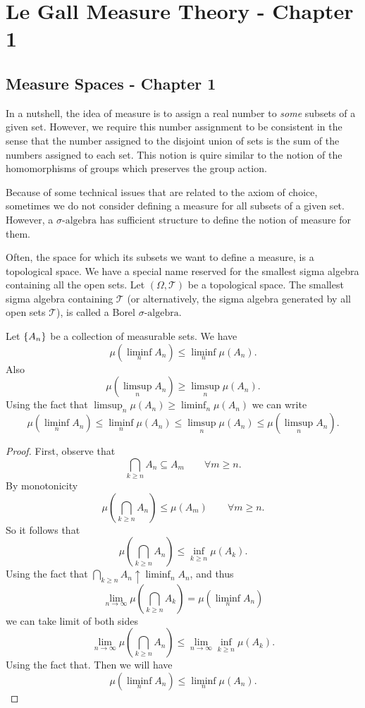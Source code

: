 \chapter{Le Gall Measure Theory - Chapter 1}



\section{Measure Spaces - Chapter 1}
In a nutshell, the idea of measure is to assign a real number to \emph{some} subsets of a given set. However, we require this number assignment to be consistent in the sense that the number assigned to the disjoint union of sets is the sum of the numbers assigned to each set. This notion is quire similar to the notion of the homomorphisms of groups which preserves the group action.

\begin{remark}
	Because of some technical issues that are related to the axiom of choice, sometimes we do not consider defining a measure for all subsets of a given set. However, a $\sigma\text{-algebra}$ has sufficient structure to define the notion of measure for them.
\end{remark}


\begin{remark}
	Often, the space for which its subsets we want to define a measure, is a topological space. We have a special name reserved for the smallest sigma algebra containing all the open sets. Let $ (\Omega,\mathcal{T}) $ be a topological space. The smallest sigma algebra containing $ \mathcal{T} $ (or alternatively, the sigma algebra generated by all open sets $ \mathcal{T} $), is called a Borel $\sigma\text{-algebra}$.
\end{remark}




\begin{proposition}
	Let $ \{A_n\} $ be a collection of measurable sets. We have
	\[ \mu(\liminf_n A_n) \leq \liminf_n \mu(A_n). \]
	Also
	\[ \mu(\limsup_n A_n) \geq \limsup_n \mu(A_n). \]
	Using the fact that $ \limsup_n \mu(A_n) \geq \liminf_n \mu(A_n) $ we can write
	\[ \mu(\liminf_n A_n) \leq \liminf_n \mu(A_n) \leq \limsup_n \mu(A_n) \leq \mu(\limsup_n A_n). \]
\end{proposition}
\begin{proof}
	First, observe that
	\[ \bigcap_{k\geq n} A_n \subseteq A_m \qquad \forall m\geq n. \]
	By monotonicity
	\[ \mu(\bigcap_{k\geq n} A_n) \leq \mu (A_m) \qquad \forall m \geq n. \]
	So it follows that 
	\[ \mu(\bigcap_{k\geq n} A_n) \leq \inf_{k\geq n}\mu(A_k).  \]
	Using the fact that $ \bigcap_{k\geq n} A_n \uparrow \liminf_n A_n $, and thus 
	\[\lim_{n\to\infty} \mu(\bigcap_{k\geq n} A_k) = \mu(\liminf_n A_n) \]
	we can take limit of both sides
	\[ \lim_{n\to\infty} \mu(\bigcap_{k\geq n}A_n) \leq \lim_{n\to\infty }\inf_{k\geq n} \mu(A_k). \]
	Using the fact that. Then we will have
	\[ \mu(\liminf_n A_n) \leq \liminf_n \mu(A_n). \]
\end{proof}


